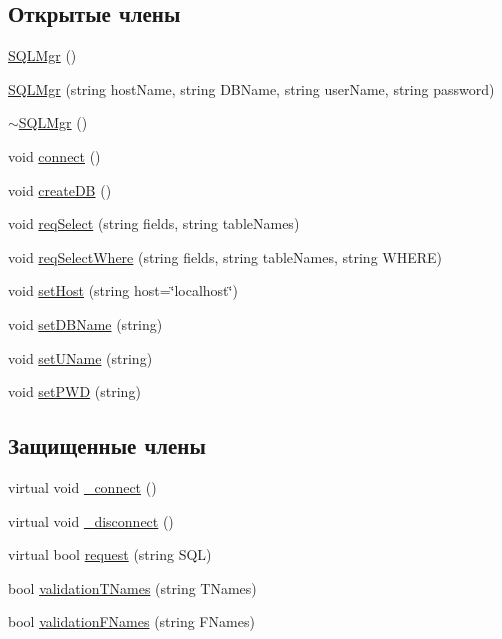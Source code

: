 \subsection*{Открытые члены}
\begin{DoxyCompactItemize}
\item 
\hyperlink{class_s_q_l_mgr_a9e3713810d0b013ee4637b6381337dca}{S\+Q\+L\+Mgr} ()
\item 
\hyperlink{class_s_q_l_mgr_a5c0e6b8359f138aefaae3c18800bf626}{S\+Q\+L\+Mgr} (string host\+Name, string D\+B\+Name, string user\+Name, string password)
\item 
\hyperlink{class_s_q_l_mgr_a15751c711901e03cf77fc24b37ca492a}{$\sim$\+S\+Q\+L\+Mgr} ()
\item 
void \hyperlink{class_s_q_l_mgr_a8310112b32ccd0913445e31d5cc2fa05}{connect} ()
\item 
void \hyperlink{class_s_q_l_mgr_af272ad3b14f896db101d938009d0b031}{create\+D\+B} ()
\item 
void \hyperlink{class_s_q_l_mgr_a35e46dfc53fdff460b5824a5f679fa5d}{req\+Select} (string fields, string table\+Names)
\item 
void \hyperlink{class_s_q_l_mgr_a823058ef5581b60bb888a58613464630}{req\+Select\+Where} (string fields, string table\+Names, string W\+H\+E\+R\+E)
\item 
void \hyperlink{class_s_q_l_mgr_a62b8a7a6430a4cf193e0ef462e468364}{set\+Host} (string host=\char`\"{}localhost\char`\"{})
\item 
void \hyperlink{class_s_q_l_mgr_ad1770ce2fe7287f0e051fb7deb5c066d}{set\+D\+B\+Name} (string)
\item 
void \hyperlink{class_s_q_l_mgr_adb9f890a6552106c8eb67631fe329c47}{set\+U\+Name} (string)
\item 
void \hyperlink{class_s_q_l_mgr_ad99374f72f5464d5aa8c7e72271282da}{set\+P\+W\+D} (string)
\end{DoxyCompactItemize}
\subsection*{Защищенные члены}
\begin{DoxyCompactItemize}
\item 
virtual void \hyperlink{class_s_q_l_mgr_ac0645ea707c71e5fad141145c1f8b735}{\+\_\+connect} ()
\item 
virtual void \hyperlink{class_s_q_l_mgr_a57da8e9e997d52caa6c4b3051998370d}{\+\_\+disconnect} ()
\item 
virtual bool \hyperlink{class_s_q_l_mgr_af931e8ab90abc8ac125ab7822020167e}{request} (string S\+Q\+L)
\item 
bool \hyperlink{class_s_q_l_mgr_aedb1c3527ed1fb7828eb5a70dda232e1}{validation\+T\+Names} (string T\+Names)
\item 
bool \hyperlink{class_s_q_l_mgr_a7b4d3b9c1526a41c61a91000e17d4dda}{validation\+F\+Names} (string F\+Names)
\end{DoxyCompactItemize}

